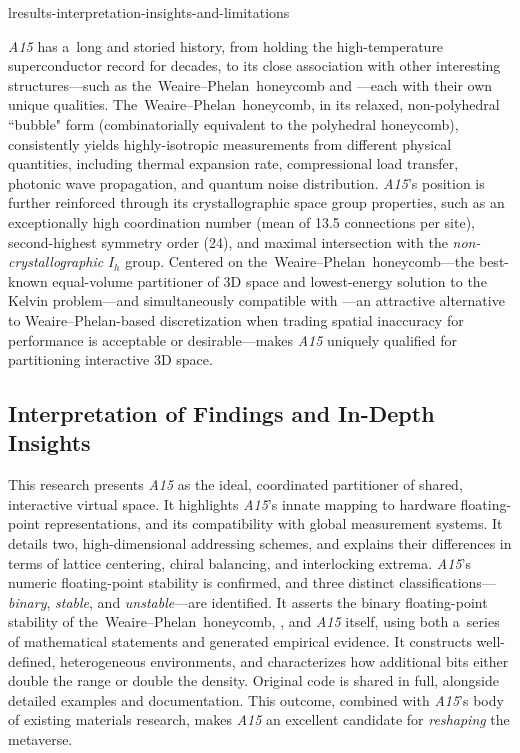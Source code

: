 \documentclass[10pt]{article}
\def\AAAB{\textit{A15}}
\def\WP{Weaire--Phelan} \def\WPH{Weaire--Phelan~Honeycomb} \def\TWPh{The~Weaire--Phelan~honeycomb}
\def\tWPh{the~Weaire--Phelan~honeycomb}
\begin{document}
l{results-interpretation-insights-and-limitations}

\AAAB{} has a~long and storied history, from holding the high-temperature superconductor record for decades, to its close
association with other interesting structures---such as \tWPh{} and \tTSp---each with their own unique qualities. \TWPh, in its
relaxed, non-polyhedral ``bubble" form (combinatorially equivalent to the polyhedral honeycomb), consistently yields
highly-isotropic measurements from different physical quantities, including thermal expansion rate, compressional load transfer,
photonic wave propagation, and quantum noise distribution. \AAAB's position is further reinforced through its crystallographic
space group properties, such as an exceptionally high coordination number (mean of 13.5 connections per site), second-highest
symmetry order (24), and maximal intersection with the \emph{non-crystallographic} $I_h$ group. Centered on \tWPh---the
best-known equal-volume partitioner of 3D space and lowest-energy solution to the Kelvin problem---and simultaneously compatible
with \tTSp---an attractive alternative to \WP-based discretization when trading spatial inaccuracy for performance is acceptable
or desirable---makes \AAAB{} uniquely qualified for partitioning interactive 3D space.

\subsection{Interpretation of Findings and In-Depth Insights}\label{interpretation-of-findings-and-in-depth-insights}

This research presents \AAAB{} as the ideal, coordinated partitioner of shared, interactive virtual space. It highlights \AAAB's
innate mapping to hardware floating-point representations, and its compatibility with global measurement systems. It details two,
high-dimensional addressing schemes, and explains their differences in terms of lattice centering, chiral balancing, and
interlocking extrema. \AAAB's numeric floating-point stability is confirmed, and three distinct classifications---\emph{binary},
\emph{stable}, and \emph{unstable}---are identified. It asserts the binary floating-point stability of \tWPh, \tTSp, and \AAAB{}
itself, using both a~series of mathematical statements and generated empirical evidence. It constructs well-defined,
heterogeneous environments, and characterizes how additional bits either double the range or double the density. Original code is
shared in full, alongside detailed examples and documentation. This outcome, combined with \AAAB's body of existing materials
research, makes \AAAB{} an excellent candidate for \emph{reshaping} the metaverse.
\end{document}

